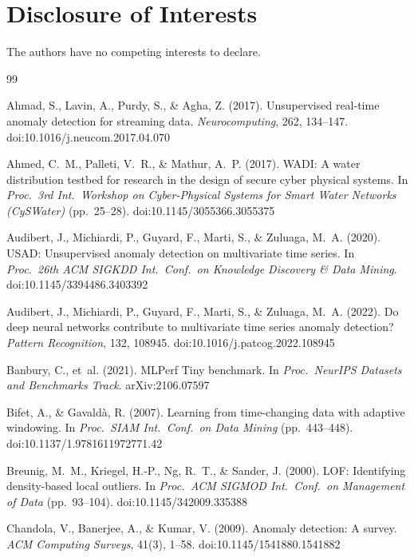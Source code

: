 \documentclass[11pt]{article}
\begin{document}
\section*{Disclosure of Interests}
The authors have no competing interests to declare.

\begin{thebibliography}{99}
\small

 Ahmad, S., Lavin, A., Purdy, S., \& Agha, Z. (2017). Unsupervised real-time anomaly detection for streaming data. \emph{Neurocomputing}, 262, 134--147. doi:10.1016/j.neucom.2017.04.070

 Ahmed, C.~M., Palleti, V.~R., \& Mathur, A.~P. (2017). WADI: A water distribution testbed for research in the design of secure cyber physical systems. In \emph{Proc.\ 3rd Int.\ Workshop on Cyber-Physical Systems for Smart Water Networks (CySWater)} (pp.\ 25--28). doi:10.1145/3055366.3055375

 Audibert, J., Michiardi, P., Guyard, F., Marti, S., \& Zuluaga, M.~A. (2020). USAD: Unsupervised anomaly detection on multivariate time series. In \emph{Proc.\ 26th ACM SIGKDD Int.\ Conf.\ on Knowledge Discovery \& Data Mining}. doi:10.1145/3394486.3403392

 Audibert, J., Michiardi, P., Guyard, F., Marti, S., \& Zuluaga, M.~A. (2022). Do deep neural networks contribute to multivariate time series anomaly detection? \emph{Pattern Recognition}, 132, 108945. doi:10.1016/j.patcog.2022.108945

 Banbury, C., et~al. (2021). MLPerf Tiny benchmark. In \emph{Proc.\ NeurIPS Datasets and Benchmarks Track}. arXiv:2106.07597

 Bifet, A., \& Gavald\`a, R. (2007). Learning from time-changing data with adaptive windowing. In \emph{Proc.\ SIAM Int.\ Conf.\ on Data Mining} (pp.\ 443--448). doi:10.1137/1.9781611972771.42

 Breunig, M.~M., Kriegel, H.-P., Ng, R.~T., \& Sander, J. (2000). LOF: Identifying density-based local outliers. In \emph{Proc.\ ACM SIGMOD Int.\ Conf.\ on Management of Data} (pp.\ 93--104). doi:10.1145/342009.335388

 Chandola, V., Banerjee, A., \& Kumar, V. (2009). Anomaly detection: A survey. \emph{ACM Computing Surveys}, 41(3), 1--58. doi:10.1145/1541880.1541882


\end{thebibliography}
\end{document}
